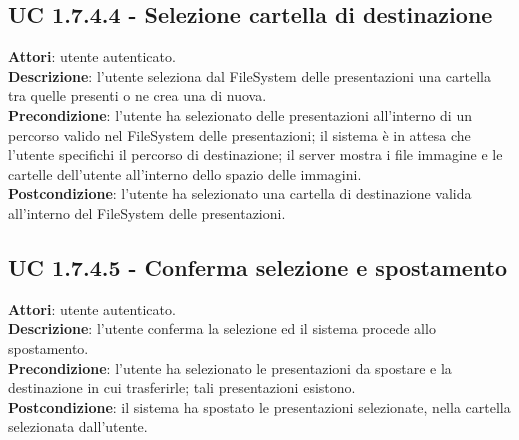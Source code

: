 		\subsection{UC 1.7.4.4 - Selezione cartella di destinazione}{
			\label{uc1.7.4.4}
			\textbf{Attori}: utente autenticato. \\
			\textbf{Descrizione}: l'utente seleziona dal FileSystem delle presentazioni una cartella tra quelle presenti o ne crea una di nuova. \\
			\textbf{Precondizione}: l'utente ha selezionato delle presentazioni all'interno di un percorso valido nel FileSystem delle presentazioni; il sistema è in attesa che l'utente specifichi il percorso di destinazione; il server mostra i file immagine e le cartelle dell'utente all'interno dello spazio delle immagini.	\\
			\textbf{Postcondizione}: l'utente ha selezionato una cartella di destinazione valida all'interno del FileSystem delle presentazioni.	\\
			}
		\subsection{UC 1.7.4.5 - Conferma selezione e spostamento}{
			\label{uc1.7.4.5}
			\textbf{Attori}: utente autenticato. \\
			\textbf{Descrizione}: l'utente conferma la selezione ed il sistema procede allo spostamento. \\
			\textbf{Precondizione}: l'utente ha selezionato le presentazioni da spostare e la destinazione in cui trasferirle; tali presentazioni esistono.	\\
			\textbf{Postcondizione}: il sistema ha spostato le presentazioni selezionate, nella cartella selezionata dall'utente.	\\
			}
